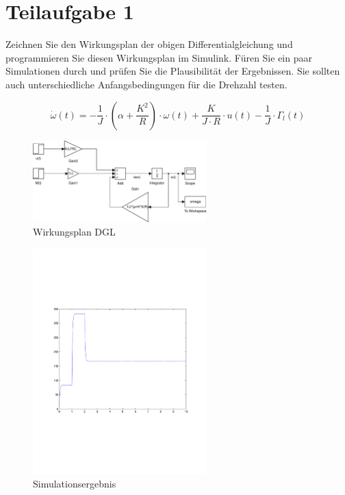 \section{Teilaufgabe 1}
\begin{aufgabe}
    Zeichnen Sie den Wirkungsplan der obigen Differentialgleichung und 
    programmieren Sie diesen Wirkungsplan im Simulink. Füren Sie ein paar 
    Simulationen durch und prüfen Sie die Plausibilität der Ergebnissen. Sie 
    sollten auch unterschiedliche Anfangsbedingungen für die Drehzahl testen.
\end{aufgabe}
\[ \dot{\omega}(t) 
    = -\frac{1}{J} \cdot \left(\alpha + \frac{K^2}{R}\right) \cdot \omega(t) 
    + \frac{K}{J \cdot R} \cdot u(t) - \frac{1}{J} \cdot \Gamma_l(t) \]
\begin{figure}[h!]
    \centering
    \includegraphics[width=0.6\textwidth]{01/wirkungsplan.pdf}
    \caption{Wirkungsplan DGL}
    \label{fig:01}
\end{figure}
\begin{figure}[h!]
    \centering
    \includegraphics[width=0.6\textwidth]{01/wirkungsplan_plot.pdf}
    \caption{Simulationsergebnis}
    \label{fig:01plot}
\end{figure}

